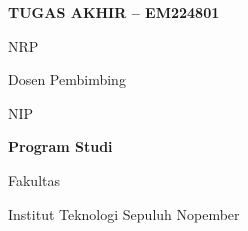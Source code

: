 {\fontsize{14}{17}\selectfont\bfseries TUGAS AKHIR -- EM224801\par}

\vspace{2\baselineskip}

{\fontsize{18}{22}\selectfont\bfseries\MakeUppercase{\tatitle}\par}

\vspace{4\baselineskip}

{\fontsize{14}{17}\selectfont\bfseries\name\par}
{\fontsize{14}{17}\selectfont NRP \nrp\par}

\vspace{3\baselineskip}

{\fontsize{12}{15}\selectfont Dosen Pembimbing\par}
{\fontsize{14}{17}\selectfont\bfseries\advisor\par}
{\fontsize{14}{17}\selectfont NIP \advisornip\par}

\vspace{3\baselineskip}

{\fontsize{14}{17}\selectfont\bfseries Program Studi \studyprogram\par}
{\fontsize{12}{15}\selectfont Fakultas \faculty\par}
{\fontsize{12}{15}\selectfont Institut Teknologi Sepuluh Nopember\par}
{\fontsize{12}{15}\selectfont \place\par}
{\fontsize{12}{15}\selectfont \the\year\par}
